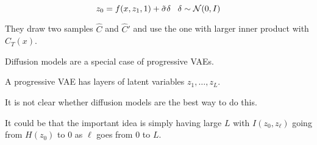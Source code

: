 {$$z_0 = f(x,z_1,1) + \tilde{\sigma}\delta\;\;\;\delta \sim {\cal N}(0,I)$$

\vfill
They draw two samples $\hat{C}$ and $\hat{C}'$ and use the one with larger inner product with $C_T(x)$.


Diffusion models are a special case of progressive VAEs.

\vfill
A progressive VAE has layers of latent variables $z_1,\dots,z_{L}$.

\vfill
It is not clear whether diffusion models are the best way to do this.

\vfill
It could be that the important idea is simply having large $L$ with
$I(z_0,z_\ell)$ going from $H(z_0)$ to 0 as $\ell$ goes from $0$ to $L$.


}


